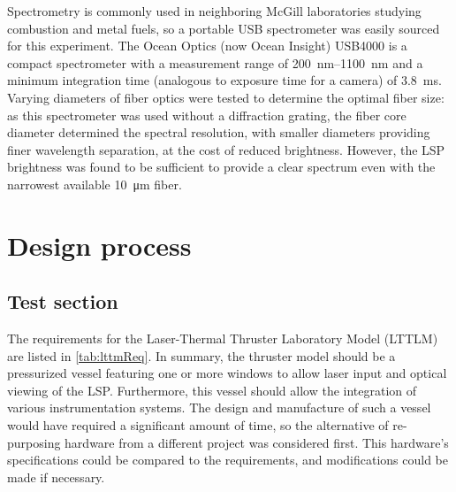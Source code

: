                 Spectrometry is commonly used in neighboring McGill laboratories studying combustion and metal fuels, so a portable USB spectrometer was easily sourced for this experiment. The Ocean Optics (now Ocean Insight) USB4000 \cite{oceanopticsUSB4000FiberOptic2008} is a compact spectrometer with a measurement range of \qtyrange{200}{1100}{nm} and a minimum integration time (analogous to exposure time for a camera) of 3.8~ms. Varying diameters of fiber optics were tested to determine the optimal fiber size: as this spectrometer was used without a diffraction grating, the fiber core diameter determined the spectral resolution, with smaller diameters providing finer wavelength separation, at the cost of reduced brightness. However, the LSP brightness was found to be sufficient to provide a clear spectrum even with the narrowest available \qty{10}{\um} fiber.

    \section{Design process}
        \subsection{Test section}
            The requirements for the Laser-Thermal Thruster Laboratory Model (LTTLM) are listed in \autoref{tab:lttmReq}. In summary, the thruster model should be a pressurized vessel featuring one or more windows to allow laser input and optical viewing of the LSP. Furthermore, this vessel should allow the integration of various instrumentation systems. The design and manufacture of such a vessel would have required a significant amount of time, so the alternative of re-purposing hardware from a different project was considered first. This hardware's specifications could be compared to the requirements, and modifications could be made if necessary.

